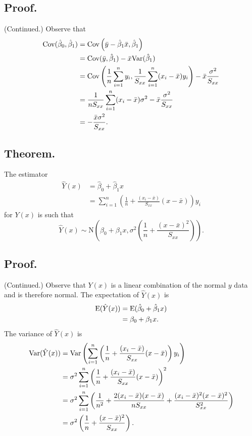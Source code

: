 \documentclass[titlepage]{article}
\begin{document}
\subsection{Proof.} (Continued.) Observe that 
\begin{align*}
    \text{Cov}(\hat{\beta}_{0}, \hat{\beta}_{1}) &= \text{Cov}\left(\bar{y} - \hat{\beta}_{1}\bar{x}, \hat{\beta}_{1}\right) \\
                                           &= \text{Cov}(\bar{y}, \hat{\beta}_{1}) - \bar{x}\text{Var}(\hat{\beta}_{1}) \\
                                           &= \text{Cov}\left(\frac{1}{n}\sum_{i=1}^{n}y_{i}, \frac{1}{S_{xx}}\sum_{i=1}^{n}(x_{i}-\bar{x})y_{i}\right) - \bar{x}\frac{\sigma^{2}}{S_{xx}} \\
                                           &= \frac{1}{nS_{xx}}\sum_{i=1}^{n}(x_{i}-\bar{x})\sigma^{2} - \bar{x}\frac{\sigma^{2}}{S_{xx}} \\
                                           &= -\frac{\bar{x}\sigma^{2}}{S_{xx}}.
\end{align*}

\subsection{Theorem.} The estimator 
\begin{align*}
    \hat{Y}(x) &= \hat{\beta}_{0} + \hat{\beta}_{1}x \\
               &= \sum_{i=1}^{n}\left(\frac{1}{n} + \frac{(x_{i}-\bar{x})}{S_{xx}}(x-\bar{x})\right)y_{i}
\end{align*}
for $Y(x)$ is such that 
$$\hat{Y}(x) \sim \text{N}\left(\beta_{0} + \beta_{1}x, \sigma^{2}\left(\frac{1}{n} + \frac{(x-\bar{x})^{2}}{S_{xx}}\right)\right).$$

\subsection{Proof.} (Continued.) Observe that $Y(x)$ is a linear combination of the normal $y$ data and is therefore normal. The expectation of $\hat{Y}(x)$ is 
\begin{align*}
    \text{E}(\hat{Y}(x)) &= \text{E}(\hat{\beta}_{0} + \hat{\beta}_{1}x) \\
                   &= \beta_{0} + \beta_{1}x.
\end{align*}
The variance of $\hat{Y}(x)$ is
\begin{align*}
    \text{Var}(\hat{Y}(x)) &= \text{Var}\left(\sum_{i=1}^{n}\left(\frac{1}{n} + \frac{(x_{i}-\bar{x})}{S_{xx}}(x-\bar{x})\right)y_{i}\right) \\
                     &= \sigma^{2}\sum_{i=1}^{n}\left(\frac{1}{n} + \frac{(x_{i}-\bar{x})}{S_{xx}}(x-\bar{x})\right)^{2} \\
                     &= \sigma^{2}\sum_{i=1}^{n}\left(\frac{1}{n^{2}} + \frac{2(x_{i}-\bar{x})(x-\bar{x})}{nS_{xx}} + \frac{(x_{i}-\bar{x})^{2}(x-\bar{x})^{2}}{S_{xx}^{2}}\right) \\
                     &= \sigma^{2}\left(\frac{1}{n} + \frac{(x-\bar{x})^{2}}{S_{xx}}\right).
\end{align*}
\end{document}
